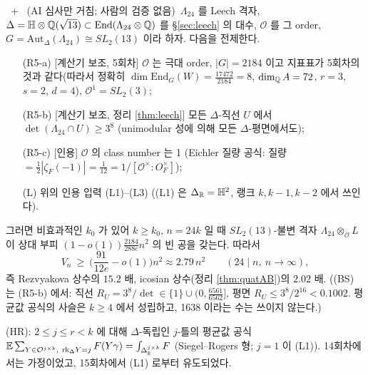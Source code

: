 \begin{theorem}\label{thm:D}\tagPL\ + \tagPC\ (AI 심사만 거침; 사람의 검증 없음)\
$\Lambda_{24}$ 를 Leech 격자, $\Delta=\mathbb{H}\otimes\mathbb{Q}(\sqrt{13})\subset\mathrm{End}(\Lambda_{24}\otimes\mathbb{Q})$ 를 \S\ref{sec:leech} 의 대수, $\mathcal O$ 를 그 order, $G=\mathrm{Aut}_\Delta(\Lambda_{24})\cong SL_2(13)$ 이라 하자. 다음을 전제한다.
\begin{itemize}
\item[(R5-a)] [계산기 보조, 5회차] $\mathcal O$ 는 극대 order, $|G|=2184$ 이고 지표표가 5회차의 것과 같다(따라서 정확히 $\dim\mathrm{End}_G(W)=\tfrac{17472}{2184}=8$, $\dim_{\mathbb{Q}} A=72$, $r=3$, $s=2$, $d=4$), $\mathcal O^1=SL_2(3)$;
\item[(R5-b)] [계산기 보조, 정리 \ref{thm:leech}] 모든 $\Delta$-직선 $U$ 에서 $\det(\Lambda_{24}\cap U)\ge3^8$ (unimodular 성에 의해 모든 $\Delta$-평면에서도);
\item[(R5-c)] [인용] $\mathcal O$ 의 class number 는 1 (Eichler 질량 공식: 질량 $=\tfrac12|\zeta_F(-1)|=\tfrac1{12}=1/[\mathcal O^\times:O_F^\times]$);
\item[(L)] 위의 인용 입력 (L1)--(L3) ((L1) 은 $\Delta_{\mathbb{R}}=\mathbb{H}^2$, 랭크 $k,k-1,k-2$ 에서 쓰인다).
\end{itemize}
그러면 비효과적인 $k_0$ 가 있어 $k\ge k_0$, $n=24k$ 일 때 $SL_2(13)$-불변 격자 $\Lambda_{24}\otimes_{\mathcal O}L$ 이 상대 부피 $(1-o(1))\tfrac{2184}{288e}n^2$ 의 빈 공을 갖는다. 따라서
\[
V_n\ \ge\ \Big(\frac{91}{12e}-o(1)\Big)n^2\approx2.79\,n^2\qquad(24\mid n,\ n\to\infty),
\]
즉 Rezvyakova 상수의 $15.2$ 배, icosian 상수(정리 \ref{thm:quatAB})의 $2.02$ 배. ((BS) 는 (R5-b) 에서: 직선 $R_U=3^8/\det\in\{1\}\cup(0,\tfrac{6561}{6562}]$, 평면 $R_U\le3^8/2^{16}<0.1002$. 평균값 공식의 사슬은 $k\ge4$ 에서 성립하고, 1638 이라는 수는 쓰이지 않는다.)
\end{theorem}
\noindent(HR): $2\le j\le r<k$ 에 대해 $\Delta$-독립인 $j$-틀의 평균값 공식 $\mathbb{E}\sum_{Y\in\mathcal O^{j\times k},\ \mathrm{rk}_\Delta Y=j}F(Y\gamma)=\int_{\Delta_{\mathbb{R}}^{j\times k}}F$ (Siegel--Rogers 형; $j=1$ 이 (L1)). 14회차에서는 가정이었고, 15회차에서 (L1) 로부터 유도되었다.

